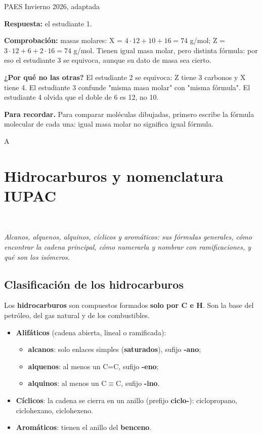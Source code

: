\begin{elejemplo}{PAES Invierno 2026, adaptada}
{ 

\textbf{Respuesta:} el estudiante 1.

 

\textbf{Comprobación:} masas molares: X = $4 \cdot 12 + 10 + 16 = 74$ g/mol; Z = $3 \cdot 12 + 6 + 2 \cdot 16 = 74$ g/mol. Tienen igual masa molar, pero distinta fórmula: por eso el estudiante 3 se equivoca, aunque su dato de masa sea cierto.

 

\textbf{¿Por qué no las otras?} El estudiante 2 se equivoca: Z tiene 3 carbonos y X tiene 4. El estudiante 3 confunde "misma masa molar" con "misma fórmula". El estudiante 4 olvida que el doble de 6 es 12, no 10.

\textbf{\color{cienciaD}Para recordar.} Para comparar moléculas dibujadas, primero escribe la fórmula molecular de cada una: igual masa molar no significa igual fórmula.}{A}
\end{elejemplo}

\section[Hidrocarburos y nomenclatura IUPAC]{Hidrocarburos y nomenclatura IUPAC}
\modcomun\ \ {\color{gris}\itshape Alcanos, alquenos, alquinos, cíclicos y aromáticos: sus fórmulas generales, cómo encontrar la cadena principal, cómo numerarla y nombrar con ramificaciones, y qué son los isómeros.\par}
\subsection{Clasificación de los hidrocarburos}
Los \textbf{hidrocarburos} son compuestos formados \textbf{solo por C e H}. Son la base del petróleo, del gas natural y de los combustibles.

 
\begin{itemize}
  \item \textbf{Alifáticos} (cadena abierta, lineal o ramificada): 
\begin{itemize}
  \item \textbf{alcanos}: solo enlaces simples (\textbf{saturados}), sufijo \textbf{-ano};
  \item \textbf{alquenos}: al menos un C=C, sufijo \textbf{-eno};
  \item \textbf{alquinos}: al menos un C\ensuremath{\equiv}C, sufijo \textbf{-ino}.
\end{itemize}
  \item \textbf{Cíclicos}: la cadena se cierra en un anillo (prefijo \textbf{ciclo-}): ciclopropano, ciclohexano, ciclohexeno.
  \item \textbf{Aromáticos}: tienen el anillo del \textbf{benceno}.
\end{itemize}
 

